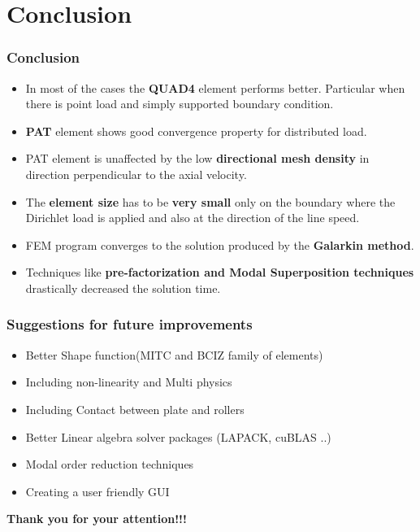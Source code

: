 \documentclass[9pt]{beamer}
\begin{document}
%
%


\section{Conclusion}
\begin{frame}\frametitle{Conclusion}

\begin{itemize}
\item In most of the cases the \textbf{QUAD4} element performs better. Particular when there is point load and simply supported boundary condition.
\item \textbf{PAT} element shows good convergence property for distributed load.
\item PAT element is unaffected by the low \textbf{directional mesh density} in direction perpendicular to the axial velocity. 
\item The \textbf{element size} has to be \textbf{very small} only on the boundary where the Dirichlet load is applied and also at the direction of the
line speed.
\item FEM program converges to the solution produced by the \textbf{Galarkin method}. 
\item Techniques like\textbf{ pre-factorization and Modal Superposition techniques} drastically decreased the solution time.
\end{itemize}

\end{frame}

\begin{frame}\frametitle{Suggestions for future improvements}
\begin{itemize}
\item Better Shape function(MITC and BCIZ family of elements)
\item Including non-linearity and Multi physics
\item Including Contact between plate and rollers
\item Better Linear algebra solver packages (LAPACK, cuBLAS ..)
\item Modal order reduction  techniques
\item Creating a user friendly GUI
\end{itemize}
\end{frame}

\begin{frame}
\begin{center}
\begin{LARGE}
\textbf{Thank you for your attention!!!}
\end{LARGE}
\end{center}


\end{frame}
\end{document}
